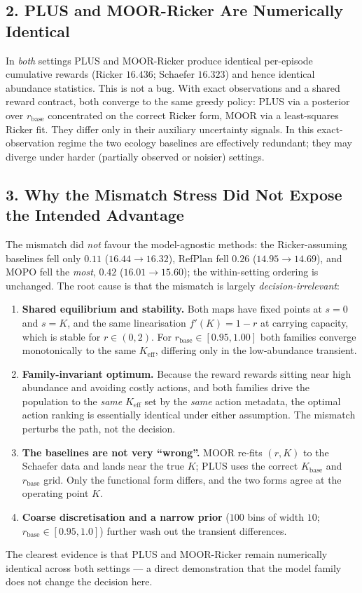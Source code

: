 \documentclass[11pt]{article}
\newcommand{\Keff}{K_{\mathrm{eff}}}
\newcommand{\rbase}{r_{\mathrm{base}}}
\begin{document}
\subsection*{2. PLUS and MOOR-Ricker Are Numerically Identical}
In \emph{both} settings PLUS and MOOR-Ricker produce identical per-episode
cumulative rewards (Ricker $16.436$; Schaefer $16.323$) and hence identical
abundance statistics. This is not a bug. With exact observations and a shared
reward contract, both converge to the same greedy policy: PLUS via a posterior over
$\rbase$ concentrated on the correct Ricker form, MOOR via a least-squares Ricker
fit. They differ only in their auxiliary uncertainty signals. In this
exact-observation regime the two ecology baselines are effectively redundant; they
may diverge under harder (partially observed or noisier) settings.

\subsection*{3. Why the Mismatch Stress Did Not Expose the Intended Advantage}
The mismatch did \emph{not} favour the model-agnostic methods: the
Ricker-assuming baselines fell only $0.11$ ($16.44 \to 16.32$), RefPlan fell $0.26$
($14.95 \to 14.69$), and MOPO fell the \emph{most}, $0.42$ ($16.01 \to 15.60$);
the within-setting ordering is unchanged. The root cause is that the mismatch is
largely \emph{decision-irrelevant}:
\begin{enumerate}
    \item \textbf{Shared equilibrium and stability.} Both maps have fixed points at
    $s=0$ and $s=K$, and the same linearisation $f'(K) = 1 - r$ at carrying
    capacity, which is stable for $r \in (0,2)$. For $\rbase \in [0.95, 1.00]$ both
    families converge monotonically to the same $\Keff$, differing only in the
    low-abundance transient.
    \item \textbf{Family-invariant optimum.} Because the reward rewards sitting near
    high abundance and avoiding costly actions, and both families drive the
    population to the \emph{same} $\Keff$ set by the \emph{same} action metadata,
    the optimal action ranking is essentially identical under either assumption.
    The mismatch perturbs the path, not the decision.
    \item \textbf{The baselines are not very ``wrong''.} MOOR re-fits $(r,K)$ to the
    Schaefer data and lands near the true $K$; PLUS uses the correct
    $K_{\mathrm{base}}$ and $\rbase$ grid. Only the functional form differs, and the
    two forms agree at the operating point $K$.
    \item \textbf{Coarse discretisation and a narrow prior} ($100$ bins of width
    $10$; $\rbase \in [0.95, 1.0]$) further wash out the transient differences.
\end{enumerate}
The clearest evidence is that PLUS and MOOR-Ricker remain numerically identical
across both settings --- a direct demonstration that the model family does not
change the decision here.
\end{document}
